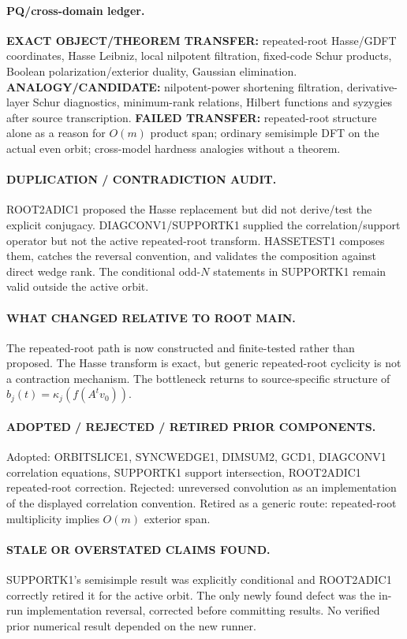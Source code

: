 \documentclass[11pt]{article}
\begin{document}
\paragraph{PQ/cross-domain ledger.}
\textbf{EXACT OBJECT/THEOREM TRANSFER:} repeated-root Hasse/GDFT coordinates, Hasse Leibniz, local nilpotent filtration, fixed-code Schur products, Boolean polarization/exterior duality, Gaussian elimination.
\textbf{ANALOGY/CANDIDATE:} nilpotent-power shortening filtration, derivative-layer Schur diagnostics, minimum-rank relations, Hilbert functions and syzygies after source transcription.
\textbf{FAILED TRANSFER:} repeated-root structure alone as a reason for \(O(m)\) product span; ordinary semisimple DFT on the actual even orbit; cross-model hardness analogies without a theorem.

\paragraph{DUPLICATION / CONTRADICTION AUDIT.}
ROOT2ADIC1 proposed the Hasse replacement but did not derive/test the explicit conjugacy. DIAGCONV1/SUPPORTK1 supplied the correlation/support operator but not the active repeated-root transform. HASSETEST1 composes them, catches the reversal convention, and validates the composition against direct wedge rank. The conditional odd-\(N\) statements in SUPPORTK1 remain valid outside the active orbit.

\paragraph{WHAT CHANGED RELATIVE TO ROOT MAIN.}
The repeated-root path is now constructed and finite-tested rather than proposed. The Hasse transform is exact, but generic repeated-root cyclicity is not a contraction mechanism. The bottleneck returns to source-specific structure of \(b_j(t)=\kappa_j(f(A^tv_0))\).

\paragraph{ADOPTED / REJECTED / RETIRED PRIOR COMPONENTS.}
Adopted: ORBITSLICE1, SYNCWEDGE1, DIMSUM2, GCD1, DIAGCONV1 correlation equations, SUPPORTK1 support intersection, ROOT2ADIC1 repeated-root correction.
Rejected: unreversed convolution as an implementation of the displayed correlation convention.
Retired as a generic route: repeated-root multiplicity implies \(O(m)\) exterior span.

\paragraph{STALE OR OVERSTATED CLAIMS FOUND.}
SUPPORTK1's semisimple result was explicitly conditional and ROOT2ADIC1 correctly retired it for the active orbit. The only newly found defect was the in-run implementation reversal, corrected before committing results. No verified prior numerical result depended on the new runner.
\end{document}
